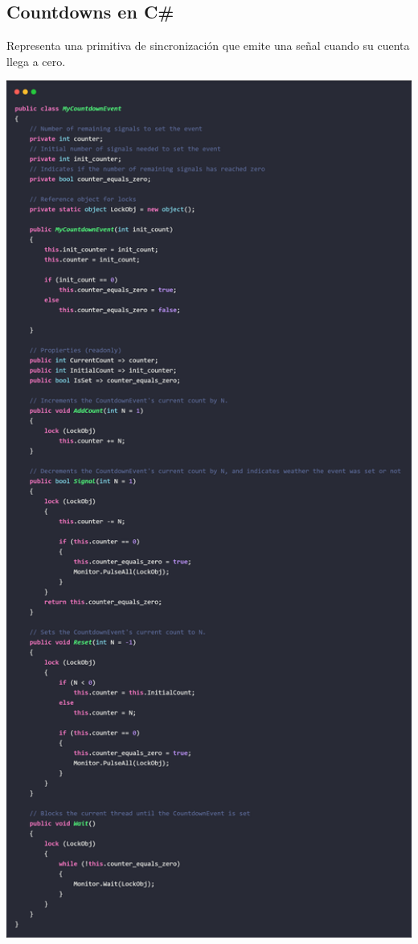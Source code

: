 \documentclass[10pt]{article} %
\begin{document}
\subsection{Countdowns en C\#}

Representa una primitiva de sincronización que emite una señal cuando su cuenta llega a cero.

\includegraphics[width=15cm]{MyCountdownEvent.jpg}
\end{document}
